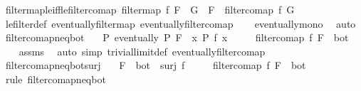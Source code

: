 \begin{isabellebody}
\endisatagproof
{\isafoldproof}%
%
\isadelimproof
\isanewline
%
\endisadelimproof
\isanewline
{}\isamarkupfalse%
\ filtermap{\isacharunderscore}{\kern0pt}le{\isacharunderscore}{\kern0pt}iff{\isacharunderscore}{\kern0pt}le{\isacharunderscore}{\kern0pt}filtercomap{\isacharcolon}{\kern0pt}\ {\isachardoublequoteopen}filtermap\ f\ F\ {\isasymle}\ G\ {\isasymlongleftrightarrow}\ F\ {\isasymle}\ filtercomap\ f\ G{\isachardoublequoteclose}\isanewline
%
\isadelimproof
\ \ %
\endisadelimproof
%
\isatagproof
{}\isamarkupfalse%
\ le{\isacharunderscore}{\kern0pt}filter{\isacharunderscore}{\kern0pt}def\ eventually{\isacharunderscore}{\kern0pt}filtermap\ eventually{\isacharunderscore}{\kern0pt}filtercomap\isanewline
\ \ \isamarkupfalse%
\ eventually{\isacharunderscore}{\kern0pt}mono\ \isamarkupfalse%
\ auto%
\endisatagproof
{\isafoldproof}%
%
\isadelimproof
\isanewline
%
\endisadelimproof
\isanewline
{}\isamarkupfalse%
\ filtercomap{\isacharunderscore}{\kern0pt}neq{\isacharunderscore}{\kern0pt}bot{\isacharcolon}{\kern0pt}\isanewline
\ \ \ {\isachardoublequoteopen}{\isasymAnd}P{\isachardot}{\kern0pt}\ eventually\ P\ F\ {\isasymLongrightarrow}\ {\isasymexists}x{\isachardot}{\kern0pt}\ P\ {\isacharparenleft}{\kern0pt}f\ x{\isacharparenright}{\kern0pt}{\isachardoublequoteclose}\isanewline
\ \ \ \ \ {\isachardoublequoteopen}filtercomap\ f\ F\ {\isasymnoteq}\ bot{\isachardoublequoteclose}\isanewline
%
\isadelimproof
\ \ %
\endisadelimproof
%
\isatagproof
{}\isamarkupfalse%
\ assms\ \isamarkupfalse%
\ {\isacharparenleft}{\kern0pt}auto\ simp{\isacharcolon}{\kern0pt}\ trivial{\isacharunderscore}{\kern0pt}limit{\isacharunderscore}{\kern0pt}def\ eventually{\isacharunderscore}{\kern0pt}filtercomap{\isacharparenright}{\kern0pt}%
\endisatagproof
{\isafoldproof}%
%
\isadelimproof
\isanewline
%
\endisadelimproof
\isanewline
{}\isamarkupfalse%
\ filtercomap{\isacharunderscore}{\kern0pt}neq{\isacharunderscore}{\kern0pt}bot{\isacharunderscore}{\kern0pt}surj{\isacharcolon}{\kern0pt}\isanewline
\ \ \ {\isachardoublequoteopen}F\ {\isasymnoteq}\ bot{\isachardoublequoteclose}\ \ {\isachardoublequoteopen}surj\ f{\isachardoublequoteclose}\isanewline
\ \ \ \ \ {\isachardoublequoteopen}filtercomap\ f\ F\ {\isasymnoteq}\ bot{\isachardoublequoteclose}\isanewline
%
\isadelimproof
%
\endisadelimproof
%
\isatagproof
{}\isamarkupfalse%
\ {\isacharparenleft}{\kern0pt}rule\ filtercomap{\isacharunderscore}{\kern0pt}neq{\isacharunderscore}{\kern0pt}bot{\isacharparenright}{\kern0pt}\isanewline

\end{isabellebody}
